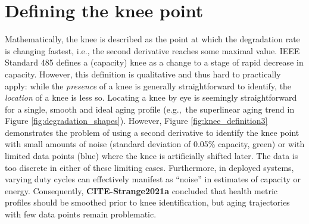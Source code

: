 \documentclass[journal=jpcl, manuscript=article, layout=onecolumn]{achemso}
\newcommand{\cmark}{\textcolor{blue}{\textrm{\ding{52}}}}%
\newcommand{\pbox}[1]{{
\fbox{
\parbox{0.8\textwidth}{  \fbox{$\triangleright$\textcolor{blue}{\textbf{From Peter}:}} 
#1
}}}}
\begin{document}
\newpage
\section{Defining the knee point}


Mathematically, the knee is described as the point at which the degradation rate is changing fastest, i.e., the second derivative reaches some maximal value. IEEE Standard 485  \cite{noauthor_ieee_2011} defines a (capacity) knee as a change to a stage of rapid decrease in capacity. However, this definition is qualitative and thus hard to practically apply: while the \textit{presence} of a knee is generally straightforward to identify, the \textit{location} of a knee is less so. 
Locating a knee by eye is seemingly straightforward for a single, smooth and ideal aging profile (e.g.,~the superlinear aging trend in Figure \ref{fig:degradation_shapes}). However, Figure \ref{fig:knee_definition3} demonstrates the problem of using a second derivative to identify the knee point with small amounts of noise (standard deviation of 0.05\% capacity, green) or with limited data points (blue) where the knee is artificially shifted later. The data is too discrete in either of these limiting cases. Furthermore, in deployed systems, varying duty cycles can effectively manifest as ``noise'' in estimates of capacity or energy.
Consequently, \textbf{CITE-Strange2021a} concluded that health metric profiles should be smoothed prior to knee identification, but aging trajectories with few data points remain problematic.
\end{document}
